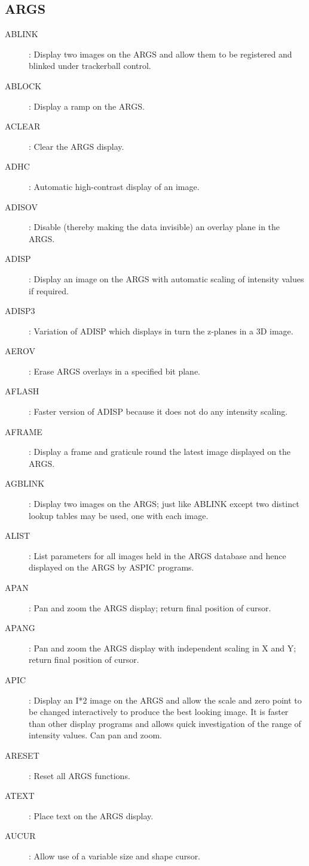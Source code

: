 \subsection {ARGS}
\begin{description}
\begin{description}
\item [ABLINK]: Display two images on the ARGS and allow them to be registered
and blinked under trackerball control.
\item [ABLOCK]: Display a ramp on the ARGS.
\item [ACLEAR]: Clear the ARGS display.
\item [ADHC]: Automatic high-contrast display of an image.
\item [ADISOV]: Disable (thereby making the data invisible) an overlay plane in
the ARGS.
\item [ADISP]: Display an image on the ARGS with automatic scaling of intensity
values if required.
\item [ADISP3]: Variation of ADISP which displays in turn the z-planes in a
3D image.
\item [AEROV]: Erase ARGS overlays in a specified bit plane.
\item [AFLASH]: Faster version of ADISP because it does not do any intensity
scaling.
\item [AFRAME]: Display a frame and graticule round the latest image displayed
on the ARGS.
\item [AGBLINK]: Display two images on the ARGS; just like ABLINK except two
distinct lookup tables may be used, one with each image.
\item [ALIST]: List parameters for all images held in the ARGS database and
hence displayed on the ARGS by ASPIC programs.
\item [APAN]: Pan and zoom the ARGS display; return final position of cursor.
\item [APANG]: Pan and zoom the ARGS display with independent scaling in X and
Y; return final position of cursor.
\item [APIC]: Display an I*2 image on the ARGS and allow the scale and zero
point to be changed interactively to produce the best looking image.
It is faster than other display programs and allows quick investigation of the
range of intensity values.
Can pan and zoom.
\item [ARESET]: Reset all ARGS functions.
\item [ATEXT]: Place text on the ARGS display.
\item [AUCUR]: Allow use of a variable size and shape cursor.

\end{description}
\end{description}
